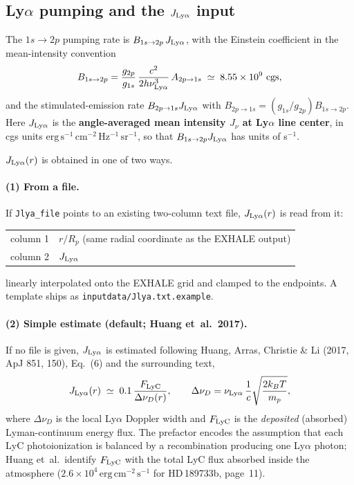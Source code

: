 \documentclass[english,a4paper]{my_memo}
\begin{document}
\subsection{Ly$\alpha$ pumping and the $J_{\rm Ly\alpha}$ input}
\label{sec:jlya}

The $1s\to2p$ pumping rate is $B_{1s\to2p}\,J_{\rm Ly\alpha}$, with the
Einstein coefficient in the mean-intensity convention
\[
  B_{1s\to2p} = \frac{g_{2p}}{g_{1s}}\,\frac{c^2}{2h\nu_{\rm Ly\alpha}^3}\,
                A_{2p\to1s} \;\simeq\; 8.55\times10^{9}\ \mathrm{cgs},
\]
and the stimulated-emission rate $B_{2p\to1s}J_{\rm Ly\alpha}$ with
$B_{2p\to1s}=(g_{1s}/g_{2p})B_{1s\to2p}$. Here $J_{\rm Ly\alpha}$ is the
\textbf{angle-averaged mean intensity $J_\nu$ at Ly$\alpha$ line center},
in cgs units $\mathrm{erg\,s^{-1}\,cm^{-2}\,Hz^{-1}\,sr^{-1}}$, so that
$B_{1s\to2p}J_{\rm Ly\alpha}$ has units of s$^{-1}$.

$J_{\rm Ly\alpha}(r)$ is obtained in one of two ways.

\paragraph{(1) From a file.} If \texttt{Jlya\_file} points to an existing
two-column text file, $J_{\rm Ly\alpha}(r)$ is read from it:
\begin{center}
\begin{tabular}{ll}
column 1 & $r/R_p$ \quad(same radial coordinate as the EXHALE output) \\
column 2 & $J_{\rm Ly\alpha}$  \\
\end{tabular}
\end{center}
\begin{sloppypar}
linearly interpolated onto the EXHALE grid and clamped to the endpoints.
A template ships as \texttt{inputdata/Jlya.txt.example}.
\end{sloppypar}

\paragraph{(2) Simple estimate (default; Huang et~al.~2017).} If no file
is given, $J_{\rm Ly\alpha}$ is estimated following Huang, Arras,
Christie \& Li (2017, ApJ 851, 150), Eq.~(6) and the surrounding text,
\[
  J_{\rm Ly\alpha}(r) \;\simeq\; 0.1\,\frac{F_{\rm LyC}}{\Delta\nu_D(r)},
  \qquad
  \Delta\nu_D = \nu_{\rm Ly\alpha}\,\frac{1}{c}\sqrt{\frac{2k_BT}{m_p}},
\]
where $\Delta\nu_D$ is the local Ly$\alpha$ Doppler width and
$F_{\rm LyC}$ is the \emph{deposited} (absorbed) Lyman-continuum energy
flux. The prefactor encodes the assumption that each LyC photoionization
is balanced by a recombination producing one Ly$\alpha$ photon; Huang
et~al.\ identify $F_{\rm LyC}$ with the total LyC flux absorbed inside
the atmosphere ($2.6\times10^{4}\,\mathrm{erg\,cm^{-2}\,s^{-1}}$ for
HD\,189733b, page~11).
\end{document}
